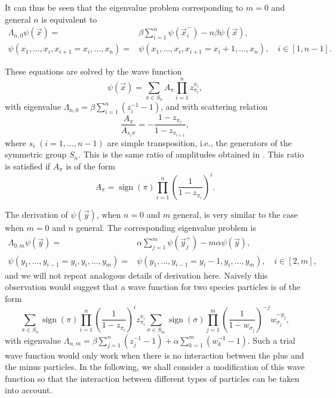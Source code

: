 \documentclass[cmp]{svjour}
\numberwithin{theorem}{section}
\numberwithin{equation}{section}
\DeclareMathOperator{\sign}{sign}
\begin{document}
It can thus be seen that the eigenvalue problem corresponding to $m=0$ and general $n$ is equivalent to
\begin{align*}
\Lambda_{n,0}\psi(\vec{x})
=&
\beta \sum_{i=1}^n\psi(\vec{x}_i^-) - n \beta \psi(\vec{x}),
\\
\psi(x_1,\dots,x_i,x_{i+1}=x_{i},\dots,x_n)
=&
\psi(x_1,\dots,x_i,x_{i+1}=x_{i}+1,\dots,x_n), \quad i\in[1,n-1].
\end{align*}

These equations are solved by the wave function $$\psi(\vec{x})=
\sum_{\pi \in S_n}A_{\pi}\prod_{i=1}^nz_{\pi_i}^{x_i},$$ with eigenvalue $\Lambda_{n,0}=\beta\sum_{i=1}^{n}(z_i^{-1}-1)$, and with scattering relation
\begin{equation*}
\frac{A_{\pi}}{A_{s_i \pi}}
=
-\frac{1-z_{\pi_i}}{1-z_{\pi_{i+1}}},
\end{equation*}
where $s_i\; (i=1,\ldots, n-1)$ are simple transposition, i.e., the generators of the symmetric group $S_n$. This is the same ratio of amplitudes obtained in \cite{S1997}. This ratio is satisfied if $A_{\pi}$ is of the form
\begin{equation*}
A_{\pi}
=
\sign(\pi) \prod_{i=1}^n \left(
\frac{1}{1-z_{\pi_i}}
\right)^i.
\end{equation*}

The derivation of $\psi(\vec{y})$, when $n=0$ and $m$ general, is very similar to the case when $m=0$ and $n$ general. The corresponding eigenvalue problem is 
\begin{align*}
\Lambda_{0,m}\psi(\vec{y})
=&\alpha \sum_{j=1}^m\psi(\vec{y}_j^+) - m \alpha \psi(\vec{y}),\\
\psi(y_1,\dots,y_{i-1}=y_{i},y_i,\dots,y_m)
=&
\psi(y_1,\dots,y_{i-1}=y_{i}-1,y_i,\dots,y_m), \quad i\in[2,m],
\end{align*}
and we will not repeat analogous details of derivation here. Naively this observation would suggest that a wave function for two species particles is of the form
\begin{equation}
\sum_{\pi\in S_n}\sign(\pi)
\prod_{i=1}^{n}
\left(\frac{1}{1-z_{\pi_i}}\right)^i
z_{\pi_i}^{x_i}
\sum_{\sigma\in S_m}\sign(\sigma)
\prod_{j=1}^{m}
\left(\frac{1}{1-w_{\sigma_j}}\right)^{-j}
w_{\sigma_j}^{-y_j},
\label{wavefn:form}
\end{equation}
with eigenvalue $\Lambda_{n,m}
=
\beta \sum_{j=1}^n (z_j^{-1}-1) +
\alpha \sum_{k=1}^m (w_k^{-1}-1).$ Such a trial wave function would only work when there is no interaction between the plus and the minus particles. In the following, we shall consider a modification of this wave function so that the interaction between different types of particles can be taken into account.
\end{document}
